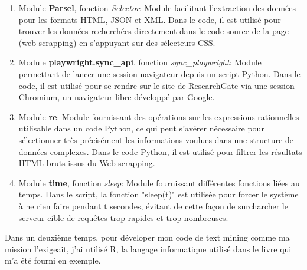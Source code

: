 \documentclass{book}
\begin{document}
\begin{description}
    \begin{enumerate}
        \item Module \textbf{Parsel}, fonction \textit{Selector}: Module
                facilitant l'extraction des données pour les formats HTML, JSON et XML. Dans le
                code, il est utilisé pour trouver les données recherchées directement dans le
                code source de la page (web scrapping) en s'appuyant sur des sélecteurs CSS.
                \vspace{\baselineskip}
        \item Module \textbf{playwright.sync\_api}, fonction
                \textit{sync\_playwright}: Module permettant de lancer une session navigateur
                depuis un script Python. Dans le code, il est utilisé pour se rendre sur le
                site de ResearchGate via une session Chromium, un navigateur libre développé
                par Google.
                \vspace{\baselineskip}
        \item Module \textbf{re}: Module fournissant des opérations sur les
                expressions rationnelles utilisable dans un code Python, ce qui peut s'avérer
                nécessaire pour sélectionner très précisément les informations voulues dans une
                structure de données complexes. Dans le code Python, il est utilisé pour
                filtrer les résultats HTML bruts issus du Web scrapping.
                \vspace{\baselineskip}
        \item Module \textbf{time}, fonction \textit{sleep}: Module
                fournissant différentes fonctions liées au temps. Dans le script, la fonction
                "sleep(t)" est utilisée pour forcer le système à ne rien faire pendant t
                secondes, évitant de cette façon de surcharcher le serveur cible de requêtes
                trop rapides et trop nombreuses.
    \end{enumerate}

\end{description}
        \vspace{\baselineskip}
        \noindent
        Dans un deuxième temps, pour déveloper mon code de text mining comme ma
        mission l'exigeait, j'ai utilisé R, la langage informatique utilisé dans le
        livre qui m'a été fourni en exemple.
\end{document}
